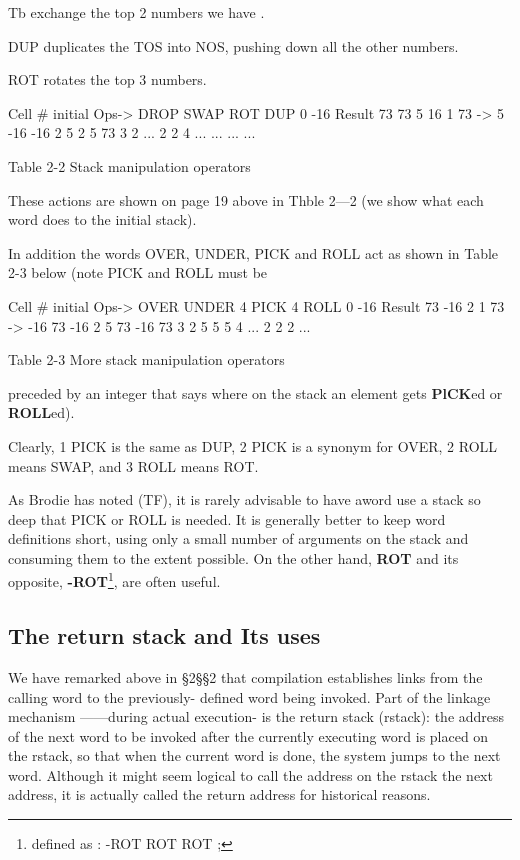 Tb exchange the top 2 numbers we have .

DUP duplicates the TOS into NOS, pushing down all the other numbers.

ROT rotates the top 3 numbers.

Cell \# 	initial 	Ops->	DROP 	SWAP	ROT		DUP
0		-16		Result	73		73		5		16
1		73		->		5		-16		-16
2		5				2		5		73
3		2				...		2		2
4		...				...		...		...

Table 2-2 Stack manipulation operators

These actions are shown on page 19 above in Thble 2—2 (we show what each word does to the initial stack).

In addition the words OVER, UNDER, PICK and ROLL act as shown in Table 2-3 below (note PICK and ROLL must be

Cell \# 	initial		Ops->	OVER	UNDER	4 PICK	4 ROLL
0 		-16		 Result 	73 		-16		2
1 		73 		-> 		-16		73		-16
2 		5 				73 		-16		73
3 		2				5 		5		5
4 		...				2		2		2		...

Table 2-3 More stack manipulation operators

preceded by an integer that says where on the stack an element gets  \textbf{PlCK}ed or  \textbf{ROLL}ed).

Clearly, 1 PICK is the same as DUP, 2 PICK is a synonym for OVER, 2 ROLL means SWAP, and 3 ROLL means ROT.

As Brodie has noted (TF), it is rarely advisable to have aword use a stack so deep that PICK or ROLL is needed. It is generally better to keep word definitions short, using only a small number of arguments on the stack and consuming them to the extent possible. On the other hand, \textbf{ROT} and its opposite, \textbf{-ROT}\footnote{defined as : -ROT ROT ROT ;}, are often useful.

\subsection{The return stack and Its uses}

We have remarked above in §2§§2 that compilation establishes links from the calling word to the previously- defined word being invoked. Part of the linkage mechanism ——during actual execution- is the return stack (rstack): the address of the next word to be invoked after the currently executing word is placed on the rstack, so that when the current word is done, the system jumps to the next word. Although it might seem logical to call the address on the rstack the next address, it is actually called the return address for historical reasons.

